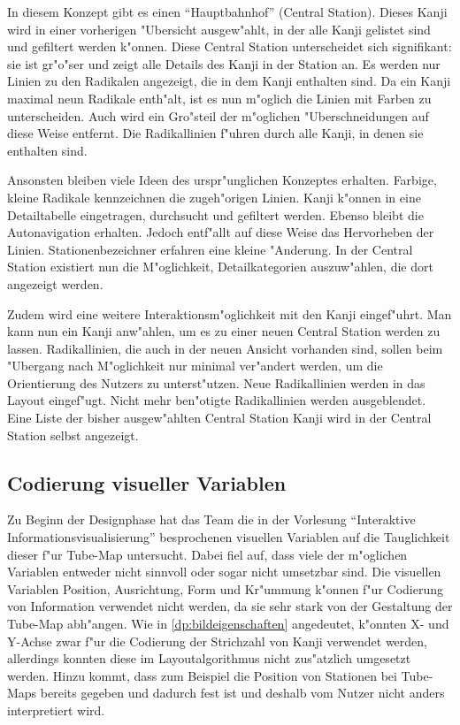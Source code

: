 In diesem Konzept gibt es einen "`Hauptbahnhof"' (Central Station). Dieses Kanji wird in einer vorherigen "Ubersicht ausgew"ahlt, in der alle Kanji gelistet sind und gefiltert werden k"onnen. Diese Central Station unterscheidet sich signifikant: sie ist gr"o"ser und zeigt alle Details des Kanji in der Station an. Es werden nur Linien zu den Radikalen angezeigt, die in dem Kanji enthalten sind. Da ein Kanji maximal neun Radikale enth"alt, ist es nun m"oglich die Linien mit Farben zu unterscheiden. Auch wird ein Gro"steil der m"oglichen "Uberschneidungen auf diese Weise entfernt. Die Radikallinien f"uhren durch alle Kanji, in denen sie enthalten sind.

Ansonsten bleiben viele Ideen des urspr"unglichen Konzeptes erhalten. Farbige, kleine Radikale kennzeichnen die zugeh"origen Linien. Kanji k"onnen in eine Detailtabelle eingetragen, durchsucht und gefiltert werden. Ebenso bleibt die Autonavigation erhalten. Jedoch entf"allt auf diese Weise das Hervorheben der Linien. Stationenbezeichner erfahren eine kleine "Anderung. In der Central Station existiert nun die M"oglichkeit, Detailkategorien auszuw"ahlen, die dort angezeigt werden. 

Zudem wird eine weitere Interaktionsm"oglichkeit mit den Kanji eingef"uhrt. Man kann nun ein Kanji anw"ahlen, um es zu einer neuen Central Station werden zu lassen. Radikallinien, die auch in der neuen Ansicht vorhanden sind, sollen beim "Ubergang nach M"oglichkeit nur minimal ver"andert werden, um die Orientierung des Nutzers zu unterst"utzen. Neue Radikallinien werden in das Layout eingef"ugt. Nicht mehr ben"otigte Radikallinien werden ausgeblendet. Eine Liste der bisher ausgew"ahlten Central Station Kanji wird in der Central Station selbst angezeigt.

\subsection{Codierung visueller Variablen}
Zu Beginn der Designphase hat das Team die in der Vorlesung "`Interaktive Informationsvisualisierung"' besprochenen visuellen Variablen auf die Tauglichkeit dieser f"ur Tube-Map untersucht. Dabei fiel auf, dass viele der m"oglichen Variablen entweder nicht sinnvoll oder sogar nicht umsetzbar sind. Die visuellen Variablen Position, Ausrichtung, Form und Kr"ummung k"onnen f"ur Codierung von Information verwendet nicht werden, da sie sehr stark von der Gestaltung der Tube-Map abh"angen. Wie in \ref{dp:bildeigenschaften} angedeutet, k"onnten X- und Y-Achse zwar f"ur die Codierung der Strichzahl von Kanji verwendet werden, allerdings konnten diese im Layoutalgorithmus nicht zus"atzlich umgesetzt werden. Hinzu kommt, dass zum Beispiel die Position von Stationen bei Tube-Maps bereits gegeben und dadurch fest ist und deshalb vom Nutzer nicht anders interpretiert wird.

